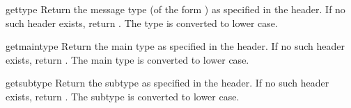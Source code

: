 \begin{methoddesc}{gettype}{}
Return the message type (of the form )
as specified in the  header.  If no such
header exists, return .  The type is converted to
lower case.
\end{methoddesc}

\begin{methoddesc}{getmaintype}{}
Return the main type as specified in the 
header.  If no such header exists, return .  The main
type is converted to lower case.
\end{methoddesc}

\begin{methoddesc}{getsubtype}{}
Return the subtype as specified in the 
header.  If no such header exists, return .  The subtype
is converted to lower case.
\end{methoddesc}

